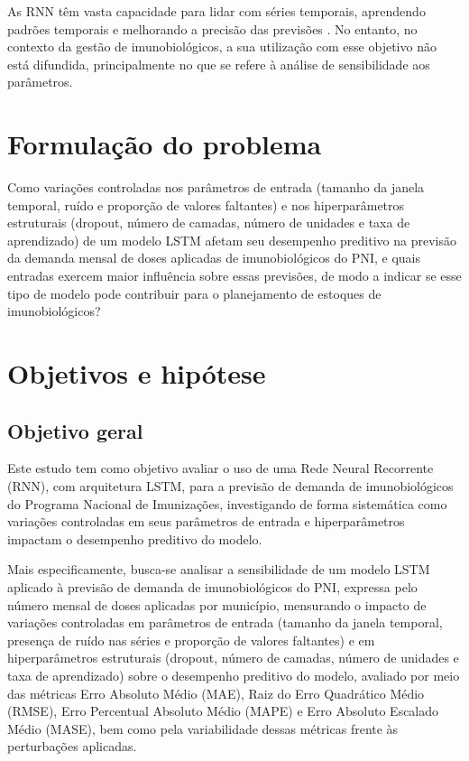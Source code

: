 \documentclass[
    12pt,
    openright,
    oneside,
    a4paper,
    english,
    brazil
]{abntex2}
\begin{document}
As RNN têm vasta capacidade para lidar com séries temporais, aprendendo padrões temporais e melhorando a precisão das previsões . No entanto, no contexto da gestão de imunobiológicos, a sua utilização com esse objetivo não está difundida, principalmente no que se refere à análise de sensibilidade aos parâmetros.

\section{Formulação do problema}
\label{sec:formulacao}

Como variações controladas nos parâmetros de entrada (tamanho da janela temporal, ruído e proporção de valores faltantes) e nos hiperparâmetros estruturais (dropout, número de camadas, número de unidades e taxa de aprendizado) de um modelo LSTM afetam seu desempenho preditivo na previsão da demanda mensal de doses aplicadas de imunobiológicos do PNI, e quais entradas exercem maior influência sobre essas previsões, de modo a indicar se esse tipo de modelo pode contribuir para o planejamento de estoques de imunobiológicos?

\section{Objetivos e hipótese}
\label{sec:objetivos}

\subsection{Objetivo geral}

Este estudo tem como objetivo avaliar o uso de uma Rede Neural Recorrente (RNN), com arquitetura LSTM, para a previsão de demanda de imunobiológicos do Programa Nacional de Imunizações, investigando de forma sistemática como variações controladas em seus parâmetros de entrada e hiperparâmetros impactam o desempenho preditivo do modelo.

Mais especificamente, busca-se analisar a sensibilidade de um modelo LSTM aplicado à previsão de demanda de imunobiológicos do PNI, expressa pelo número mensal de doses aplicadas por município, mensurando o impacto de variações controladas em parâmetros de entrada (tamanho da janela temporal, presença de ruído nas séries e proporção de valores faltantes) e em hiperparâmetros estruturais (dropout, número de camadas, número de unidades e taxa de aprendizado) sobre o desempenho preditivo do modelo, avaliado por meio das métricas Erro Absoluto Médio (MAE), Raiz do Erro Quadrático Médio (RMSE), Erro Percentual Absoluto Médio (MAPE) e Erro Absoluto Escalado Médio (MASE), bem como pela variabilidade dessas métricas frente às perturbações aplicadas.
\end{document}
